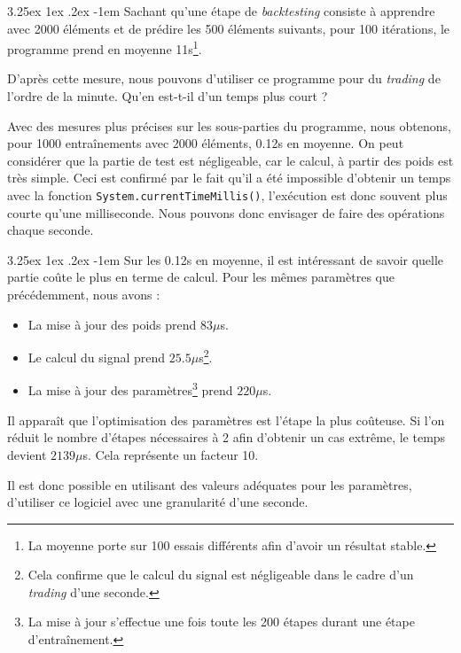 \documentclass[a4paper, 11pt]{article}
\makeatletter
\renewcommand\paragraph{\@startsection{paragraph}{5}{\z@}%
  {3.25ex \@plus1ex \@minus.2ex}%
  {-1em}%
  {\normalfont\normalsize\bfseries}}
\makeatother
\begin{document}
\paragraph{}
Sachant qu'une étape de \textit{backtesting} consiste à apprendre avec 2000 éléments et de prédire les 500 éléments suivants, pour 100 itérations, le programme prend en moyenne 11s\footnote{La moyenne porte sur 100 essais différents afin d'avoir un résultat stable.}.

D'après cette mesure,  nous pouvons d'utiliser ce programme pour du \textit{trading} de l'ordre de la minute. Qu'en est-t-il d'un temps plus court ?

Avec des mesures plus précises sur les sous-parties du programme, nous obtenons, pour 1000 entraînements avec 2000 éléments, 0.12s en moyenne. On peut considérer que la partie de test est négligeable, car le calcul, à partir des poids est très simple. Ceci est confirmé par le fait qu'il a été impossible d'obtenir un temps avec la fonction \lstinline|System.currentTimeMillis()|, l'exécution est donc souvent plus courte qu'une milliseconde.
Nous pouvons donc envisager de faire des opérations chaque seconde.

\paragraph{}
Sur les 0.12s en moyenne, il est intéressant de savoir quelle partie coûte le plus en terme de calcul.
Pour les mêmes paramètres que précédemment, nous avons :
\begin{itemize}
	\item La mise à jour des poids prend $83\mu$s.
	\item Le calcul du signal prend $25.5\mu$s\footnote{Cela confirme que le calcul du signal est négligeable dans le cadre d'un \textit{trading} d'une seconde.}.
	\item La mise à jour des paramètres\footnote{La mise à jour s'effectue une fois toute les 200 étapes durant une étape d'entraînement.} prend $220\mu$s.
\end{itemize}

Il apparaît que l'optimisation des paramètres est l'étape la plus coûteuse. Si l'on réduit le nombre d'étapes nécessaires à 2 afin d'obtenir un cas extrême, le temps devient $2139\mu$s. Cela représente un facteur 10.

Il est donc possible en utilisant des valeurs adéquates pour les paramètres, d'utiliser ce logiciel avec une granularité d'une seconde.
\end{document}
